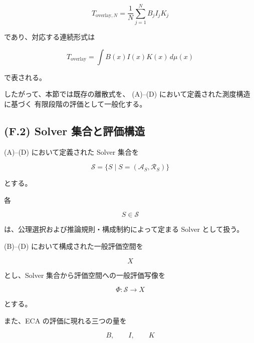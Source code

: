 \documentclass[a4paper,11pt]{article}
\begin{document}
\begin{equation}
    T_{\mathrm{overlay},N}
    =
    \frac{1}{N}
    \sum_{j=1}^{N}
    B_j I_j K_j
    \label{eq:F-original-discrete}
\end{equation}

であり、対応する連続形式は

\begin{equation}
    T_{\mathrm{overlay}}
    =
    \int
    B(x)I(x)K(x)\,d\mu(x)
    \label{eq:F-original-continuous}
\end{equation}

で表される。

したがって、本節では既存の離散式を、
(A)--(D) において定義された測度構造に基づく
有限段階の評価として一般化する。


\subsection{(F.2) Solver 集合と評価構造}
\label{subsec:F2}

(A)--(D) において定義された Solver 集合を

\begin{equation}
    \mathcal{S}
    =
    \{S\mid S=(\mathcal{A}_S,\mathcal{R}_S)\}
    \label{eq:F-solver-set}
\end{equation}

とする。

各

\begin{equation}
    S\in\mathcal{S}
\end{equation}

は、公理選択および推論規則・構成制約によって定まる Solver
として扱う。

(B)--(D) において構成された一般評価空間を

\begin{equation}
    X
\end{equation}

とし、Solver 集合から評価空間への一般評価写像を

\begin{equation}
    \Phi:
    \mathcal{S}
    \longrightarrow
    X
    \label{eq:F-general-evaluation-map}
\end{equation}

とする。

また、ECA の評価に現れる三つの量を

\begin{equation}
    B,\qquad I,\qquad K
\end{equation}
\end{document}
